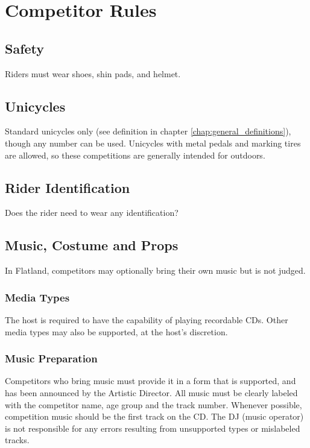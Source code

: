 \chapter{Competitor Rules}

\section{Safety}

Riders must wear shoes, shin pads, and helmet.

\section{Unicycles}

Standard unicycles only (see definition in chapter \ref{chap:general_definitions}), though any number can be used.
Unicycles with metal pedals and marking tires are allowed, so these competitions are generally intended for outdoors.

\section{Rider Identification}

\begin{framed}
Does the rider need to wear any identification?
\end{framed}

\section{Music, Costume and Props}
In Flatland, competitors may optionally bring their own music but is not judged.

\subsection{Media Types}
The host is required to have the capability of playing recordable CDs.
Other media types may also be supported, at the host's discretion.

\subsection{Music Preparation}
Competitors who bring music must provide it in a form that is supported, and has been announced by the Artistic Director.
All music must be clearly labeled with the competitor name, age group and the track number.
Whenever possible, competition music should be the first track on the CD.
The DJ (music operator) is not responsible for any errors resulting from unsupported types or mislabeled tracks.

